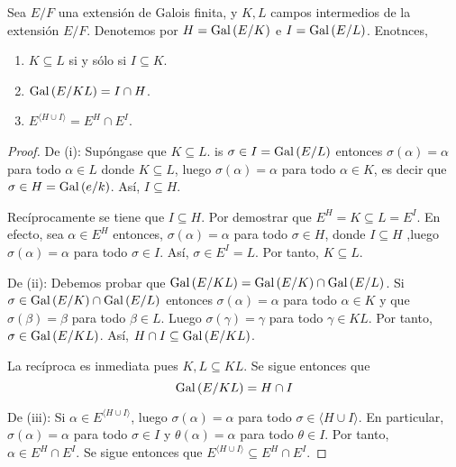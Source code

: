 \documentclass[12pt]{report}
\theoremstyle{largebreak}
\begin{document}
    \begin{propo}
        Sea $E/F$ una extensión de Galois finita, y $K,L$ campos intermedios de la extensión $E/F$. Denotemos por $H=\textup{Gal}\left(E/K\right)$ e $I=\textup{Gal}\left(E/L\right)$. Enotnces,
        \begin{enumerate}
            \item $K\subseteq L$ si y sólo si $I\subseteq K$.
            \item $\textup{Gal}\left(E/KL\right)=I\cap H$.
            \item $E^{\langle H\cup I\rangle}=E^H\cap E^I$.
        \end{enumerate}
    \end{propo}

    \begin{proof}
        De (i): Supóngase que $K\subseteq L$. is $\sigma\in I=\textup{Gal}\left(E/L\right)$ entonces $\sigma(\alpha)=\alpha$ para todo $\alpha\in L$ donde $K\subseteq L$, luego $\sigma(\alpha)=\alpha$ para todo $\alpha\in K$, es decir que $\sigma\in H=\textup{Gal}\left(e/k\right)$. Así, $I\subseteq H$.

        Recíprocamente se tiene que $I\subseteq H$. Por demostrar que $E^H=K\subseteq L=E^I$. En efecto, sea $\alpha\in E^H$ entonces, $\sigma(\alpha)=\alpha$ para todo $\sigma\in H$, donde $I\subseteq H$ ,luego $\sigma(\alpha)=\alpha$ para todo $\sigma\in I$. Así, $\sigma\in E^I=L$. Por tanto, $K\subseteq L$.

        De (ii): Debemos probar que $\textup{Gal}\left(E/KL\right)=\textup{Gal}\left(E/K\right)\cap\textup{Gal}\left(E/L\right)$. Si $\sigma\in\textup{Gal}\left(E/K\right)\cap\textup{Gal}\left(E/L\right)$ entonces $\sigma(\alpha)=\alpha$ para todo $\alpha\in K$ y que $\sigma(\beta)=\beta$ para todo $\beta\in L$. Luego $\sigma(\gamma)=\gamma$ para todo $\gamma\in KL$. Por tanto, $\sigma\in\textup{Gal}\left(E/KL\right)$. Así, $H\cap I\subseteq\textup{Gal}\left(E/KL\right)$.

        La recíproca es inmediata pues $K,L\subseteq KL$. Se sigue entonces que
        \begin{equation*}
            \textup{Gal}\left(E/KL\right)=H\cap I
        \end{equation*}

        De (iii): Si $\alpha\in E^{ \langle H\cup I \rangle}$, luego $\sigma(\alpha)=\alpha$ para todo $\sigma\in\langle H\cup I\rangle$. En particular, $\sigma(\alpha)=\alpha$ para todo $\sigma\in I$ y $\theta(\alpha)=\alpha$ para todo $\theta\in I$. Por tanto, $\alpha\in E^H\cap E^I$. Se sigue entonces que $E^{ \langle H\cup I \rangle}\subseteq E^H\cap E^I$.


\end{proof}
\end{document}
